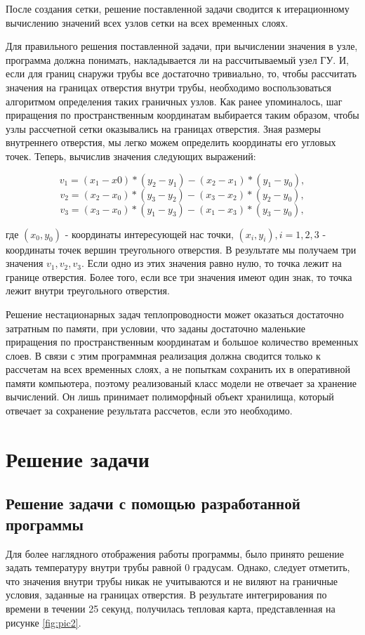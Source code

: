 \documentclass[12pt, a4paper]{article}
\begin{document}
	После создания сетки, решение поставленной задачи сводится к итерационному вычислению значений всех узлов сетки на всех временных слоях.
	
	Для правильного решения поставленной задачи, при вычислении значения в узле, программа должна понимать, накладывается ли на рассчитываемый узел ГУ. И, если для границ снаружи трубы все достаточно тривиально, то, чтобы рассчитать значения на границах отверстия внутри трубы, необходимо воспользоваться алгоритмом определения таких граничных узлов. Как ранее упоминалось, шаг приращения по пространственным координатам выбирается таким образом, чтобы узлы рассчетной сетки оказывались на границах отверстия. Зная размеры внутреннего отверстия, мы легко можем определить координаты его угловых точек. Теперь, вычислив значения следующих выражений:
	
	\[
	v_1 = (x_1-x0)*(y_2-y_1)-(x_2-x_1)*(y_1-y_0),
	\]
	\[
	v_2 = (x_2-x_0)*(y_3-y_2)-(x_3-x_2)*(y_2-y_0),
	\]
	\[
	v_3 = (x_3-x_0)*(y_1-y_3)-(x_1-x_3)*(y_3-y_0),
	\]
	
	где $(x_0, y_0)$ - координаты интересующей нас точки, $(x_i, y_i), i = 1, 2, 3$ - координаты точек вершин треугольного отверстия. В результате мы получаем три значения $v_1, v_2, v_3$. Если одно из этих значения равно нулю, то точка лежит на границе отверстия. Более того, если все три значения имеют один знак, то точка лежит внутри треугольного отверстия.
	
	Решение нестационарных задач теплопроводности может оказаться достаточно затратным по памяти, при условии, что заданы достаточно маленькие приращения по пространственным координатам и большое количество временных слоев. В связи с этим программная реализация должна сводится только к рассчетам на всех временных слоях, а не попыткам сохранить их в оперативной памяти компьютера, поэтому реализованый класс модели не отвечает за хранение вычислений. Он лишь принимает полиморфный объект хранилища, который отвечает за сохранение результата рассчетов, если это необходимо.
	
	\section{Решение задачи}
	\subsection{Решение задачи с помощью разработанной программы}
	
	Для более наглядного отображения работы программы, было принято решение задать температуру внутри трубы равной 0 градусам. Однако, следует отметить, что значения внутри трубы никак не учитываются и не виляют на граничные условия, заданные на границах отверстия. В результате интегрирования по времени в течении 25 секунд, получилась тепловая карта, представленная на рисунке \ref{fig:pic2}. 
	
\end{document}

